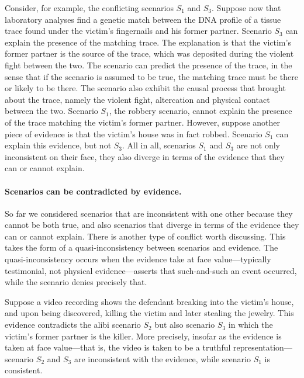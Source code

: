 \documentclass[10pt]{article}
\begin{document}

Consider, for example, the conflicting scenarios $S_1$ and $S_3$.
Suppose now that laboratory analyses find a genetic match between the DNA profile of a tissue trace found under 
the victim's fingernails and his former partner. Scenario $S_3$ can explain the presence of the matching trace. The explanation is that the victim's former partner is the 
source of the trace, which was deposited during the violent fight between the two. The scenario can predict 
the presence of the trace, in the sense that if the scenario is assumed to be true, the matching trace must be there or 
likely to be there. The scenario also exhibit the causal process that brought about the trace, namely the violent fight, altercation 
and physical contact between the two.  Scenario $S_1$, the robbery scenario, cannot explain the presence of the trace matching the victim's former partner. 
However, suppose another piece of evidence 
is that the victim's house was in fact robbed. Scenario $S_1$ can explain this evidence, but not $S_3$. All in all, scenarios $S_1$ and $S_3$ 
are not only inconsistent on their face, they also diverge
in terms of the evidence that they can or cannot explain.

\paragraph{Scenarios can be contradicted by evidence.} So far we considered scenarios that are 
inconsistent with one other because 
they cannot be both true, and also scenarios that diverge in terms of 
the evidence they can or cannot explain. There is another type of conflict worth discussing. This takes the form of 
a quasi-inconsistency between scenarios and  evidence. The quasi-inconsistency occurs when the evidence take at face value---typically testimonial, not physical evidence---asserts 
that such-and-such an event occurred, while the scenario 
denies precisely that. 

Suppose a video recording shows the defendant 
breaking into the victim's house, and upon being discovered, 
killing the victim and later stealing the jewelry. 
This evidence contradicts the alibi scenario $S_2$ but also scenario $S_3$ 
in which the victim's former partner is the killer.  More precisely, insofar as the evidence 
is taken at face value---that is, the video is taken to be a truthful representation---scenario $S_2$ and $S_3$ 
are inconsistent with the evidence, while scenario $S_1$ is consistent. 
\end{document}
